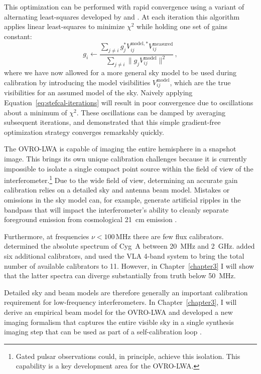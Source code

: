 \begin{bibunit}
This optimization can be performed with rapid convergence using a variant of alternating
least-squares developed by \citet{2008ISTSP...2..707M} and \citet{2014A&A...571A..97S}. At each
iteration this algorithm applies linear least-squares to minimize $\chi^2$ while holding one set of
gains constant:
\begin{equation}\label{eq:stefcal-iterations}
    g_i \leftarrow \frac
        {\sum_{j\neq i} g_j^* V_{ij}^{\text{model},*} V_{ij}^\text{measured}}
        {\sum_{j\neq i} \| g_j V_{ij}^\text{model} \|^2}\,,
\end{equation}
where we have now allowed for a more general sky model to be used during calibration by introducing
the model visibilities $V_{ij}^\text{model}$, which are the true visibilities for an assumed model
of the sky.  Naively applying Equation~\ref{eq:stefcal-iterations} will result in poor convergence
due to oscillations about a minimum of $\chi^2$.  These oscillations can be damped by averaging
subsequent iterations, and \citet{2014A&A...571A..97S} demonstrated that this simple gradient-free
optimization strategy converges remarkably quickly.

The OVRO-LWA is capable of imaging the entire hemisphere in a snapshot image. This brings its own
unique calibration challenges because it is currently impossible to isolate a single compact point source
within the field of view of the interferometer.\footnote{
    Gated pulsar observations could, in principle, achieve this isolation. This capability is a key
    development area for the OVRO-LWA.
}
Due to the wide field of view, determining an accurate gain calibration relies on a detailed sky and
antenna beam model. Mistakes or omissions in the sky model can, for example, generate artificial
ripples in the bandpass that will impact the interferometer's ability to cleanly separate foreground
emission from cosmological 21~cm emission \citep{2016MNRAS.461.3135B, 2017MNRAS.470.1849E}.

Furthermore, at frequencies $\nu < 100\,\text{MHz}$ there are few flux calibrators.
\citet{1977A&A....61...99B} determined the absolute spectrum of Cyg~A between 20~MHz and 2~GHz.
\citet{2012MNRAS.423L..30S} added six additional calibrators, and \citet{2017ApJS..230....7P} used
the VLA 4-band system to bring the total number of available calibrators to 11. However, in
Chapter~\ref{chapter3} I will show that the latter spectra can diverge substantially from truth
below 50~MHz.

Detailed sky and beam models are therefore generally an important calibration requirement for
low-frequency interferometers.  In Chapter~\ref{chapter3}, I will derive an empirical beam model for
the OVRO-LWA and developed a new imaging formalism that captures the entire visible sky in a single
synthesis imaging step that can be used as part of a self-calibration loop
\citep{1978ApJ...223...25R}.


\end{bibunit}
